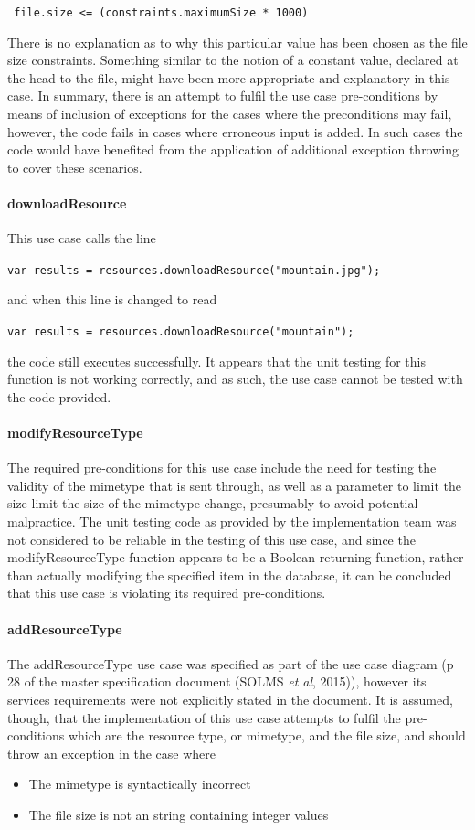 \documentclass[a4paper]{article}
\begin{document}
\texttt{	file.size <= (constraints.maximumSize * 1000)}

There is no explanation as to why this particular value has been chosen as the file size constraints. Something similar to the notion of a constant value, declared at the head to the file, might have been more appropriate and explanatory in this case.
In summary, there is an attempt to fulfil the use case pre-conditions by means of inclusion of exceptions for the cases where the preconditions may fail, however, the code fails in cases where erroneous input is added. In such cases the code would have benefited from the application of additional exception throwing to cover these scenarios.

\paragraph{downloadResource} 

This use case calls the line 

\texttt{var results = resources.downloadResource("mountain.jpg");}

and when this line is changed to read

\texttt{var results = resources.downloadResource("mountain");}

the code still executes successfully. It appears that the unit testing for this function is not working correctly, and as such, the use case cannot be tested with the code provided. 

\paragraph{modifyResourceType}
The required pre-conditions for this use case include the need for testing the validity of the mimetype that is sent through, as well as a parameter to limit the size limit the size of the mimetype change, presumably to avoid potential malpractice. The unit testing code as provided by the implementation team was not considered to be reliable in the testing of this use case, and since the modifyResourceType function appears to be a Boolean returning function, rather than actually modifying the specified item in the database, it can be concluded that this use case is violating its required pre-conditions.

\paragraph{addResourceType}
The addResourceType use case was specified as part of the use case diagram (p 28 of the master specification document (SOLMS \textit{et al}, 2015)), however its services requirements were not explicitly stated in the document. It is assumed, though, that the implementation of this use case attempts to fulfil the pre-conditions which are the resource type, or mimetype, and the file size, and should throw an exception in the case where
\begin{itemize}
\item The mimetype is syntactically incorrect
\item The file size is not an string containing integer values
\end{itemize}
\end{document}
